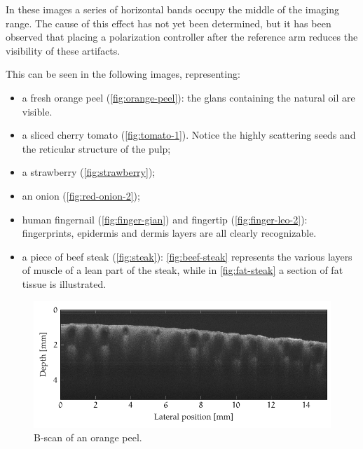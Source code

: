 


In these images a series of horizontal bands occupy the middle of the imaging range. The cause of this effect has not yet been determined, but it has been observed that placing a polarization controller after the reference arm reduces the visibility of these artifacts. 

This can be seen in the following images, representing:
\begin{itemize}
	\item a fresh orange peel (\autoref{fig:orange-peel}): the glans containing the natural oil are visible.
	
	\item a sliced cherry tomato (\autoref{fig:tomato-1}). Notice the highly scattering seeds and the reticular structure of the pulp;
	
	\item a strawberry (\autoref{fig:strawberry});
	
	\item an onion (\autoref{fig:red-onion-2});
	
	\item human fingernail (\autoref{fig:finger-gian}) and fingertip (\autoref{fig:finger-leo-2}): fingerprints, epidermis and dermis layers are all clearly recognizable.
	
	\item a piece of beef steak (\autoref{fig:steak}): \autoref{fig:beef-steak} represents the various layers of muscle of a lean part of the steak, while in \autoref{fig:fat-steak} a section of fat tissue is illustrated.
\end{itemize}

\begin{figure}[hbt]
	\centering
	\includegraphics[width=0.9\linewidth]{gfx/ch4/axsun/no-bande/orange-peel}
	\caption{B-scan of an orange peel.}\label{fig:orange-peel}
\end{figure}

